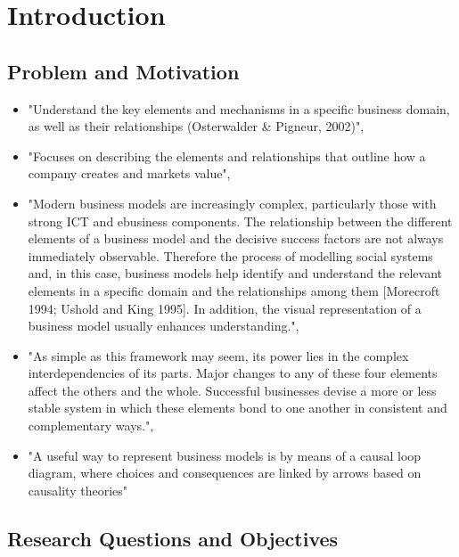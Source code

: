 \chapter{Introduction}\label{ch:intro}

\section{Problem and Motivation}\label{ch:intro:mo}

\begin{itemize}
	\item "Understand the key elements and mechanisms in a specific business domain, as well as their relationships (Osterwalder \& Pigneur, 2002)", \citep[p. 303]{Pateli2004}
	\item "Focuses on describing the elements and relationships that outline how a company creates and markets value", \citep[p. 7]{Osterwalder2005}
	\item "Modern business models are increasingly complex, particularly those with strong ICT and ebusiness components. The relationship between the different elements of a business model and the decisive success factors are not always immediately observable. Therefore the process of modelling social systems and, in this case, business models help identify and understand the relevant elements in a specific domain and the relationships among them [Morecroft 1994; Ushold and King 1995]. In addition, the visual representation of a business model usually enhances understanding.", \citep[p. 14]{Osterwalder2005}
	\item "As simple as this framework may seem, its power lies in the complex interdependencies of its parts. Major changes to any of these four elements affect the others and the whole. Successful businesses devise a more or less stable system in which these elements bond to one another in consistent and complementary ways.", \citep[p. 53]{Johnson2008}
	\item "A useful way to represent business models is by means of a causal loop diagram, where choices and consequences are linked by arrows based on causality theories" \citep[p. 198]{Casadesus-Masanell2010}
\end{itemize}


\section{Research Questions and Objectives}\label{ch:intro:rq}

